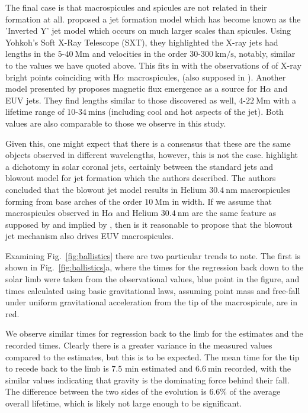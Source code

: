The final case is that macrospicules and spicules are not related in their formation at all. \cite{Shibata1992} proposed a jet formation model which has become known as the 'Inverted Y' jet model which occurs on much larger scales than spicules. Using Yohkoh's Soft X-Ray Telescope (SXT), they highlighted the X-ray jets had lengths in the $5$-$40\ \textrm{Mm}$ and velocities in the order $30$-$300\ \textrm{km/s}$, notably, similar to the values we have quoted above. This fits in with the observations of \cite{Moore1977} of X-ray bright points coinciding with H$\alpha$ macrospicules, (also supposed in \cite{Kamio2010}). Another model presented by \cite{Jiang2007} proposes magnetic flux emergence as a source for H$\alpha$ and EUV jets. They find lengths similar to those discovered as well, $4$-$22\ \textrm{Mm}$ with a lifetime range of $10$-$34\ \textrm{mins}$ (including cool and hot aspects of the jet). Both values are also comparable to those we observe in this study.

Given this, one might expect that there is a consensus that these are the same objects observed in different wavelengths, however, this is not the case. \cite{Moore2010} highlight a dichotomy in solar coronal jets, certainly between the standard jets \cite{Shibata1992} and blowout model for jet formation which the authors described. The authors concluded that the blowout jet model results in Helium $30.4\ \textrm{nm}$ macrospicules forming from base arches of the order $10\ \textrm{Mm}$ in width. If we assume that macrospicules observed in H$\alpha$ and Helium $30.4\ \textrm{nm}$ are the same feature as supposed by \cite{LaBonte79} and implied by \cite{Parenti2002}, then is it reasonable to propose that the blowout jet mechanism also drives EUV macrospicules.

Examining Fig.~\ref{fig:ballistics} there are two particular trends to note. The first is shown in Fig.~\ref{fig:ballistics}a, where the times for the regression back down to the solar limb were taken from the observational values, blue point in the figure, and times calculated using basic gravitational laws, assuming point mass and free-fall under uniform gravitational acceleration from the tip of the macrospicule, are in red. 

We observe similar times for regression back to the limb for the estimates and the recorded times. Clearly there is a greater variance in the measured values compared to the estimates, but this is to be expected. The mean time for the tip to recede back to the limb is $7.5$ min estimated and $6.6\ \textrm{min}$ recorded, with the similar values indicating that gravity is the dominating force behind their fall. The difference between the two sides of the evolution is $6.6\%$ of the average overall lifetime, which is likely not large enough to be significant. 

